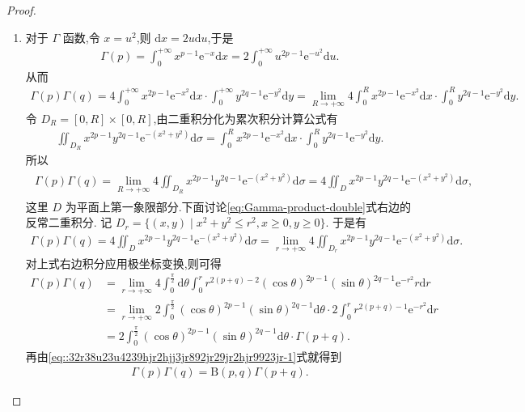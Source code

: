 \documentclass[../../main.tex]{subfiles}%
\begin{document}
\begin{proof}
\begin{enumerate}[(1)]
\item 对于 $\Gamma$ 函数,令 $x=u^2$,则 $\mathrm{d}x=2u\mathrm{d}u$,于是
\begin{align*}
\Gamma(p) = \int_{0}^{+\infty} x^{p-1}\mathrm{e}^{-x}\mathrm{d}x = 2\int_{0}^{+\infty} u^{2p-1}\mathrm{e}^{-u^2}\mathrm{d}u.
\end{align*}
从而
\begin{align*}
\Gamma(p)\Gamma(q) = 4\int_{0}^{+\infty} x^{2p-1}\mathrm{e}^{-x^2}\mathrm{d}x \cdot \int_{0}^{+\infty} y^{2q-1}\mathrm{e}^{-y^2}\mathrm{d}y 
= \lim_{R\to+\infty} 4\int_{0}^{R} x^{2p-1}\mathrm{e}^{-x^2}\mathrm{d}x \cdot \int_{0}^{R} y^{2q-1}\mathrm{e}^{-y^2}\mathrm{d}y.
\end{align*}
令 $D_R=[0,R]\times[0,R]$,由二重积分化为累次积分计算公式有
\begin{align*}
\iint_{D_R} x^{2p-1}y^{2q-1}\mathrm{e}^{-(x^2+y^2)}\mathrm{d}\sigma
= \int_{0}^{R} x^{2p-1}\mathrm{e}^{-x^2}\mathrm{d}x \cdot \int_{0}^{R} y^{2q-1}\mathrm{e}^{-y^2}\mathrm{d}y.
\end{align*}
所以
\begin{align}
\begin{split}
\Gamma(p)\Gamma(q) = \lim_{R\to+\infty} 4\iint_{D_R} x^{2p-1}y^{2q-1}\mathrm{e}^{-(x^2+y^2)}\mathrm{d}\sigma 
= 4\iint_{D} x^{2p-1}y^{2q-1}\mathrm{e}^{-(x^2+y^2)}\mathrm{d}\sigma,
\end{split}
\label{eq:Gamma-product-double}
\end{align}
这里 $D$ 为平面上第一象限部分.下面讨论\eqref{eq:Gamma-product-double}式右边的反常二重积分. 记
$D_r = \{(x,y)\mid x^2+y^2 \leqslant r^2, x \geqslant 0, y \geqslant 0\}$.
于是有
\begin{align*}
\Gamma(p)\Gamma(q) = 4\iint_{D} x^{2p-1}y^{2q-1}\mathrm{e}^{-(x^2+y^2)}\mathrm{d}\sigma 
= \lim_{r\to+\infty} 4\iint_{D_r} x^{2p-1}y^{2q-1}\mathrm{e}^{-(x^2+y^2)}\mathrm{d}\sigma.
\end{align*}
对上式右边积分应用极坐标变换,则可得
\begin{align*}
\Gamma(p)\Gamma(q) &= \lim_{r\to+\infty} 4\int_{0}^{\frac{\pi}{2}} \mathrm{d}\theta \int_{0}^{r} r^{2(p+q)-2}(\cos\theta)^{2p-1}(\sin\theta)^{2q-1}\mathrm{e}^{-r^2}r\mathrm{d}r \\
&= \lim_{r\to+\infty} 2\int_{0}^{\frac{\pi}{2}} (\cos\theta)^{2p-1}(\sin\theta)^{2q-1}\mathrm{d}\theta \cdot 2\int_{0}^{r} r^{2(p+q)-1}\mathrm{e}^{-r^2}\mathrm{d}r \\
&= 2\int_{0}^{\frac{\pi}{2}} (\cos\theta)^{2p-1}(\sin\theta)^{2q-1}\mathrm{d}\theta \cdot \Gamma(p+q).
\end{align*}
再由\eqref{eq::32r38u23u4239hjr2hjj3jr892jr29jr2hjr9923jr-1}式就得到
\begin{align*}
\Gamma(p)\Gamma(q) = \mathrm{B}(p,q)\Gamma(p+q).
\end{align*}
\end{enumerate}
\end{proof}
\end{document}
